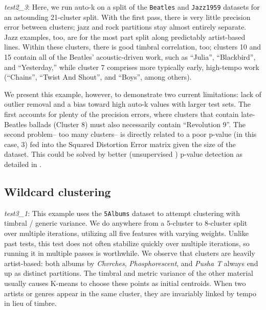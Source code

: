 \documentclass[12pt,twocolumn,titlepage]{article}
\begin{document}
\emph{test2\_3}: Here, we run auto-k on a split of the \texttt{Beatles} and \texttt{Jazz1959} datasets for an astounding 21-cluster split. With the first pass, there is very little precision error between clusters; jazz and rock partitions stay almost entirely separate. Jazz examples, too, are for the most part split along predictably artist-based lines. Within these clusters, there is good timbral correlation, too; clusters 10 and 15 contain all of the Beatles' acoustic-driven work, such as ``Julia'', ``Blackbird'', and ``Yesterday,'' while cluster 7 comprises more typically early, high-tempo work (``Chains'', ``Twist And Shout'', and ``Boys'', among others). 

We present this example, however, to demonstrate two current limitations: lack of outlier removal and a bias toward high auto-k values with larger test sets. The first accounts for plenty of the precision errors, where clusters that contain late-Beatles ballads (Cluster 8) must also necessarily contain ``Revolution 9''. The second problem-- too many clusters-- is directly related to a poor p-value (in this case, 3) fed into the Squared Distortion Error matrix given the size of the dataset. This could be solved by better (unsupervised ) p-value detection as detailed in \cite{SemiSupPNorm}.

\subsection{Wildcard clustering}

\emph{test3\_1}: This example uses the \texttt{5Albums} dataset to attempt clustering with timbral / generic variance. We do anywhere from a 5-cluster to 8-cluster split over multiple iterations, utilizing all five features with varying weights. Unlike past tests, this test does not often stabilize quickly over multiple iterations, so running it in multiple passes is worthwhile. We observe that clusters are heavily artist-based: both albums by \emph{Chvrches}, \emph{Phosphorescent}, and \emph{Pusha T} always end up as distinct partitions. The timbral and metric variance of the other material usually causes K-means to choose these points as initial centroids. When two artists or genres appear in the same cluster, they are invariably linked by tempo in lieu of timbre. 
\end{document}
